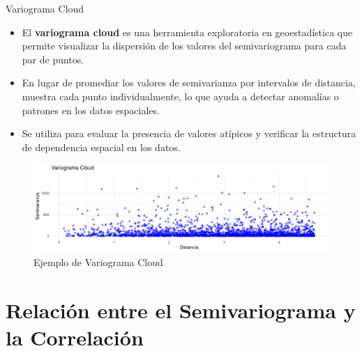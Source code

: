\documentclass[
  10pt,
  ignorenonframetext,
]{beamer}
\providecommand{\tightlist}{%
  \setlength{\itemsep}{0pt}\setlength{\parskip}{0pt}}
\begin{document}
\begin{frame}{Variograma Cloud}
\begin{itemize}
\tightlist
\item
  El \textbf{variograma cloud} es una herramienta exploratoria en
  geoestadística que permite visualizar la dispersión de los valores del
  semivariograma para cada par de puntos.
\item
  En lugar de promediar los valores de semivarianza por intervalos de
  distancia, muestra cada punto individualmente, lo que ayuda a detectar
  anomalías o patrones en los datos espaciales.
\item
  Se utiliza para evaluar la presencia de valores atípicos y verificar
  la estructura de dependencia espacial en los datos.
\end{itemize}

\begin{figure}
\centering
\includegraphics{imagenes/unnamed-chunk-2-1.pdf}
\caption{Ejemplo de Variograma Cloud}
\end{figure}
\end{frame}

\section{Relación entre el Semivariograma y la
Correlación}\label{relaciuxf3n-entre-el-semivariograma-y-la-correlaciuxf3n}
\end{document}
